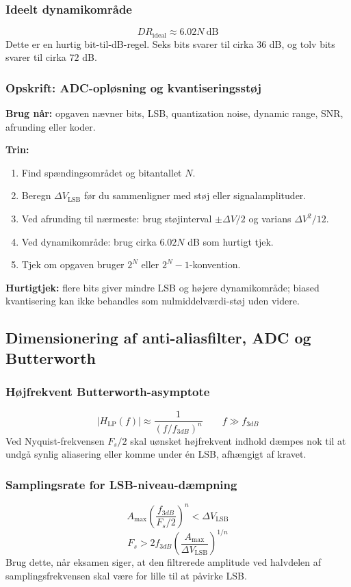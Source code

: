\subsubsection{Ideelt dynamikområde}
\[
DR_{\mathrm{ideal}}\approx 6.02N\ \mathrm{dB}
\]
Dette er en hurtig bit-til-dB-regel. Seks bits svarer til cirka \(36\) dB, og tolv bits svarer til cirka \(72\) dB.

\subsubsection{Opskrift: ADC-opløsning og kvantiseringsstøj}
\textbf{Brug når:} opgaven nævner bits, LSB, quantization noise, dynamic range, SNR, afrunding eller koder.

\textbf{Trin:}
\begin{enumerate}
    \item Find spændingsområdet og bitantallet \(N\).
    \item Beregn \(\Delta V_{\mathrm{LSB}}\) før du sammenligner med støj eller signalamplituder.
    \item Ved afrunding til nærmeste: brug støjinterval \(\pm\Delta V/2\) og varians \(\Delta V^2/12\).
    \item Ved dynamikområde: brug cirka \(6.02N\) dB som hurtigt tjek.
    \item Tjek om opgaven bruger \(2^N\) eller \(2^N-1\)-konvention.
\end{enumerate}

\textbf{Hurtigtjek:} flere bits giver mindre LSB og højere dynamikområde; biased kvantisering kan ikke behandles som nulmiddelværdi-støj uden videre.

\subsection{Dimensionering af anti-aliasfilter, ADC og Butterworth}

\subsubsection{Højfrekvent Butterworth-asymptote}
\[
|H_{\mathrm{LP}}(f)|\approx \frac{1}{(f/f_{3dB})^n}\qquad f\gg f_{3dB}
\]
Ved Nyquist-frekvensen \(F_s/2\) skal uønsket højfrekvent indhold dæmpes nok til at undgå synlig aliasering eller komme under én LSB, afhængigt af kravet.

\subsubsection{Samplingsrate for LSB-niveau-dæmpning}
\[
A_{\max}\left(\frac{f_{3dB}}{F_s/2}\right)^n<\Delta V_{\mathrm{LSB}}
\]
\[
F_s>2f_{3dB}\left(\frac{A_{\max}}{\Delta V_{\mathrm{LSB}}}\right)^{1/n}
\]
Brug dette, når eksamen siger, at den filtrerede amplitude ved halvdelen af samplingsfrekvensen skal være for lille til at påvirke LSB.

